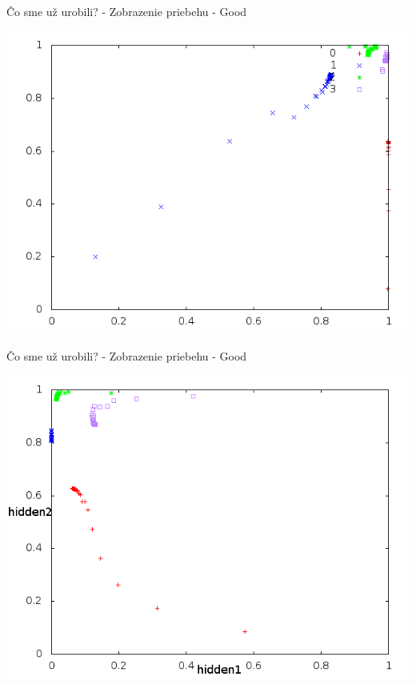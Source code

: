 \documentclass[xcolor=dvipsnames]{beamer}
\begin{document}
\begin{frame}{Čo sme už urobili? - Zobrazenie priebehu - Good}
    \begin{center}
      \includegraphics[scale=0.5]{img/right_top.png}
    \end{center} 
\end{frame}
\begin{frame}{Čo sme už urobili? - Zobrazenie priebehu - Good}
    \begin{center}
      \includegraphics[scale=0.5]{img/left_top.png}
    \end{center} 
\end{frame}
\end{document}
